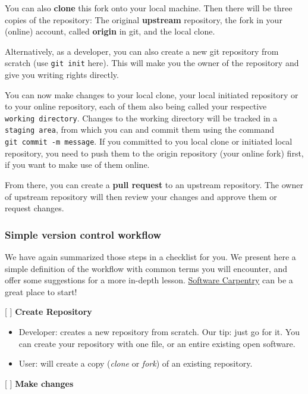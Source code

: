 \documentclass[
  letterpaper,
  DIV=11,
  numbers=noendperiod]{scrreport}
\providecommand{\tightlist}{%
  \setlength{\itemsep}{0pt}\setlength{\parskip}{0pt}}\usepackage{longtable,booktabs,array}
\begin{document}
You can also \textbf{clone} this fork onto your local machine. Then
there will be three copies of the repository: The original
\textbf{upstream} repository, the fork in your (online) account, called
\textbf{origin} in git, and the local clone.

Alternatively, as a developer, you can also create a new git repository
from scratch (use \texttt{git\ init} here). This will make you the owner
of the repository and give you writing rights directly.

You can now make changes to your local clone, your local initiated
repository or to your online repository, each of them also being called
your respective \texttt{working\ directory}. Changes to the working
directory will be tracked in a \texttt{staging\ area}, from which you
can and commit them using the command \texttt{git\ commit\ -m\ message}.
If you committed to you local clone or initiated local repository, you
need to push them to the origin repository (your online fork) first, if
you want to make use of them online.

From there, you can create a \textbf{pull request} to an upstream
repository. The owner of upstream repository will then review your
changes and approve them or request changes.

\hypertarget{simple-version-control-workflow}{%
\subsubsection{Simple version control
workflow}\label{simple-version-control-workflow}}

We have again summarized those steps in a checklist for you. We present
here a simple definition of the workflow with common terms you will
encounter, and offer some suggestions for a more in-depth lesson.
\href{https://swcarpentry.github.io/git-novice/}{Software Carpentry} can
be a great place to start!

{[} {]} \textbf{Create Repository}

\begin{itemize}
\tightlist
\item
  Developer: creates a new repository from scratch. Our tip: just go for
  it. You can create your repository with one file, or an entire
  existing open software.
\item
  User: will create a copy (\emph{clone} or \emph{fork}) of an existing
  repository.
\end{itemize}

{[} {]} \textbf{Make changes}
\end{document}
